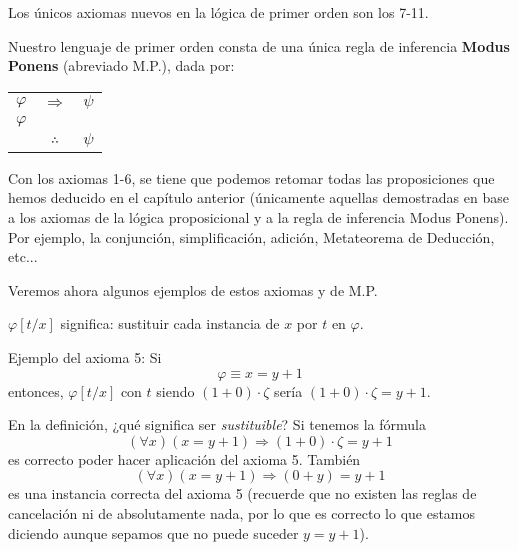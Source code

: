 \documentclass[12pt]{report}
\newcounter{it}
\theoremstyle{largebreak}
\begin{document}
    Los únicos axiomas nuevos en la lógica de primer orden son los 7-11.

    \begin{mydef}
        Nuestro lenguaje de primer orden consta de una única regla de inferencia \textbf{Modus Ponens} (abreviado M.P.), dada por:
        \begin{center}
            \begin{tabular}{c c c}
                $\varphi$ & $\Rightarrow$ & $\psi$ \\
                $\varphi$ &  &  \\
                \hline
                 & $\therefore$ & $\psi$ \\
            \end{tabular}
        \end{center}
    \end{mydef}

    Con los axiomas 1-6, se tiene que podemos retomar todas las proposiciones que hemos deducido en el capítulo anterior (únicamente aquellas demostradas en base a los axiomas de la lógica proposicional y a la regla de inferencia Modus Ponens). Por ejemplo, la conjunción, simplificación, adición, Metateorema de Deducción, etc...

    Veremos ahora algunos ejemplos de estos axiomas y de M.P.

    \begin{obs}
        $\varphi[t/x]$ significa: sustituir cada instancia de $x$ por $t$ en $\varphi$.
    \end{obs}

    \begin{exa}
        Ejemplo del axioma 5: Si
        \begin{equation*}
            \varphi\equiv x=y+1
        \end{equation*}
        entonces, $\varphi[t/x]$ con $t$ siendo $(1+0)\cdot\zeta$ sería $(1+0)\cdot\zeta=y+1$.
    \end{exa}

    \begin{exa}
        En la definición, ¿qué significa ser \textit{sustituible}? Si tenemos la fórmula
        \begin{equation*}
            (\forall x)(x=y+1)\Rightarrow(1+0)\cdot\zeta=y+1
        \end{equation*}
        es correcto poder hacer aplicación del axioma 5. También
        \begin{equation*}
            (\forall x)(x=y+1)\Rightarrow(0+y)=y+1
        \end{equation*}
        es una instancia correcta del axioma 5 (recuerde que no existen las reglas de cancelación ni de absolutamente nada, por lo que es correcto lo que estamos diciendo aunque sepamos que no puede suceder $y=y+1$).
    \end{exa}
\end{document}
